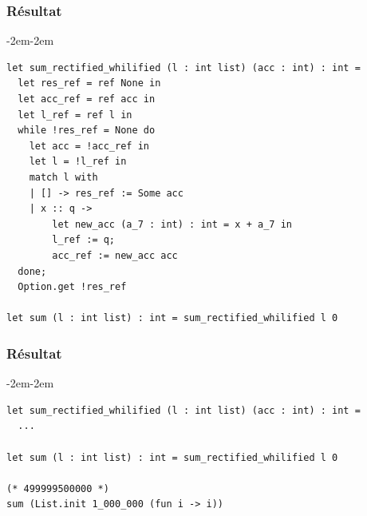 \begin{frame}[fragile,t]
    \frametitle{Résultat}

    \begin{adjustwidth}{-2em}{-2em}
        \small \begin{verbatim}
let sum_rectified_whilified (l : int list) (acc : int) : int =
  let res_ref = ref None in
  let acc_ref = ref acc in
  let l_ref = ref l in
  while !res_ref = None do
    let acc = !acc_ref in
    let l = !l_ref in
    match l with
    | [] -> res_ref := Some acc
    | x :: q ->
        let new_acc (a_7 : int) : int = x + a_7 in
        l_ref := q;
        acc_ref := new_acc acc
  done;
  Option.get !res_ref

let sum (l : int list) : int = sum_rectified_whilified l 0
        \end{verbatim}

    \end{adjustwidth}
\end{frame}

\addtocounter{framenumber}{-1}
\begin{frame}[fragile,t]
    \frametitle{Résultat}

    \begin{adjustwidth}{-2em}{-2em}
        \small \begin{verbatim}
let sum_rectified_whilified (l : int list) (acc : int) : int =
  ...

let sum (l : int list) : int = sum_rectified_whilified l 0

(* 499999500000 *)
sum (List.init 1_000_000 (fun i -> i))
        \end{verbatim}

    \end{adjustwidth}
\end{frame}

